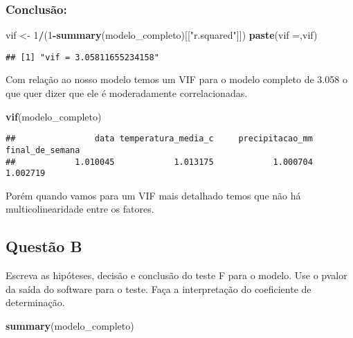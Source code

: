 \documentclass[
]{article}
\newenvironment{Shaded}{\begin{snugshade}}{\end{snugshade}}
\newcommand{\DecValTok}[1]{\textcolor[rgb]{0.00,0.00,0.81}{#1}}
\newcommand{\FunctionTok}[1]{\textcolor[rgb]{0.13,0.29,0.53}{\textbf{#1}}}
\newcommand{\NormalTok}[1]{#1}
\newcommand{\OtherTok}[1]{\textcolor[rgb]{0.56,0.35,0.01}{#1}}
\newcommand{\SpecialCharTok}[1]{\textcolor[rgb]{0.81,0.36,0.00}{\textbf{#1}}}
\newcommand{\StringTok}[1]{\textcolor[rgb]{0.31,0.60,0.02}{#1}}
\begin{document}
\hypertarget{conclusuxe3o}{%
\subsubsection{Conclusão:}\label{conclusuxe3o}}

\begin{Shaded}
\begin{Highlighting}[]
\NormalTok{vif }\OtherTok{\textless{}{-}} \DecValTok{1}\SpecialCharTok{/}\NormalTok{(}\DecValTok{1}\SpecialCharTok{{-}}\FunctionTok{summary}\NormalTok{(modelo\_completo)[[}\StringTok{"r.squared"}\NormalTok{]])}
\FunctionTok{paste}\NormalTok{(}\StringTok{\textquotesingle{}vif =\textquotesingle{}}\NormalTok{,vif)}
\end{Highlighting}
\end{Shaded}

\begin{verbatim}
## [1] "vif = 3.05811655234158"
\end{verbatim}

Com relação ao nosso modelo temos um VIF para o modelo completo de 3.058
o que quer dizer que ele é moderadamente correlacionadas.

\begin{Shaded}
\begin{Highlighting}[]
\FunctionTok{vif}\NormalTok{(modelo\_completo)}
\end{Highlighting}
\end{Shaded}

\begin{verbatim}
##                data temperatura_media_c     precipitacao_mm     final_de_semana 
##            1.010045            1.013175            1.000704            1.002719
\end{verbatim}

Porém quando vamos para um VIF mais detalhado temos que não há
multicolinearidade entre os fatores.

\hypertarget{questuxe3o-b}{%
\subsection{Questão B}\label{questuxe3o-b}}

Escreva as hipóteses, decisão e conclusão do teste F para o modelo. Use
o pvalor da saída do software para o teste. Faça a interpretação do
coeficiente de determinação.

\begin{Shaded}
\begin{Highlighting}[]
\FunctionTok{summary}\NormalTok{(modelo\_completo)}
\end{Highlighting}
\end{Shaded}
\end{document}
